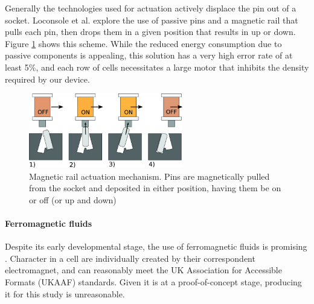 Generally the technologies used for actuation actively displace the pin out of a socket.
Loconsole et al. \cite{loconsole_braillecursor_2019} explore the use of passive pins and a magnetic rail that pulls each pin, then drops them in a given position that results in up or down. Figure \ref{fig:magnetic-rail} shows this scheme.
While the reduced energy consumption due to passive components is appealing, this solution has a very high error rate of at least 5\%, and each row of cells necessitates a large motor that inhibits the density required by our device.
\begin{figure}[h]
\centering
    \includegraphics[width=0.6\textwidth]{figures/magnetic-rail.jpg}
\caption[Magnetic rail actuation mechanism]{Magnetic rail actuation mechanism. Pins are magnetically pulled from the socket and deposited in either position, having them be on or off (or up and down)}
\label{fig:magnetic-rail}
\end{figure}  

\paragraph{Ferromagnetic fluids}
Despite its early developmental stage, the use of ferromagnetic fluids is promising \cite{fletcher_magnetic_2021}.
Character in a cell are individually created by their correspondent electromagnet, and can reasonably meet the UK Association for Accessible Formats (UKAAF) standards.
Given it is at a proof-of-concept stage, producing it for this study is unreasonable.